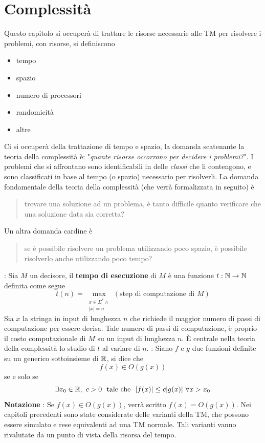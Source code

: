 \documentclass[10pt, letterpaper]{report}
\begin{document}
\chapter{Complessità}
Questo capitolo si occuperà di trattare le risorse necessarie alle TM per risolvere i problemi, con risorse, si definiscono \begin{itemize}
    \item tempo 
    \item spazio 
    \item numero di processori 
    \item randomicità 
    \item altre
\end{itemize}
Ci si occuperà della trattazione di tempo e spazio, la domanda scatenante la teoria della complessità è: "\textit{quante risorse occorrono per decidere i problemi?}".\acc 
I problemi che si affrontano sono identificabili in delle \textit{classi} che li contengono, e sono classificati in base al tempo (o spazio) necessario per risolverli. La domanda fondamentale della teoria della complessità (che verrà formalizzata in seguito) è \begin{quote}
    trovare una soluzione ad un problema, è tanto difficile quanto verificare che una soluzione data sia corretta?
\end{quote}
Un altra domanda cardine è\begin{quote}
    se è possibile risolvere un problema utilizzando poco spazio, è possibile risolverlo anche utilizzando poco tempo?
\end{quote}
 : Sia $M$ un decisore, il \textbf{tempo di esecuzione} di $M$ è una funzione $t:{\mathbb N}\rightarrow {\mathbb N}$ definita come segue 
$$ t(n)=\max_{\begin{matrix}x\in\Sigma^* \land \\ |x|=n\end{matrix}}(\text{step di computazione di }M)$$
Sia $x$ la stringa in input di lunghezza $n$ che richiede il maggior numero di passi di computazione per essere decisa. Tale numero di passi di computazione, è proprio il costo computazionale di $M$ su un input di lunghezza $n$. È centrale nella teoria della complessità lo studio di $t$ al variare di $n$.\acc 
{} : Siano $f$ e $g$ due funzioni definite su un generico sottoinsieme di ${\mathbb R}$, si dice che $$ f(x)\in O(g(x))$$ 
se e solo se 
$$ \exists x_0\in \R,\ c>0 \ \text{ tale che } \ |f(x)|\le c|g(x)| \ \forall x>x_0$$
\textbf{Notazione} : Se $f(x)\in O(g(x))$, verrà scritto $f(x)=O(g(x))$.\acc 
Nei capitoli precedenti sono state considerate delle varianti della TM, che possono essere simulato e rese equivalenti ad una TM normale. Tali varianti vanno rivalutate da un punto di vista della risorsa del tempo. 
\end{document}

